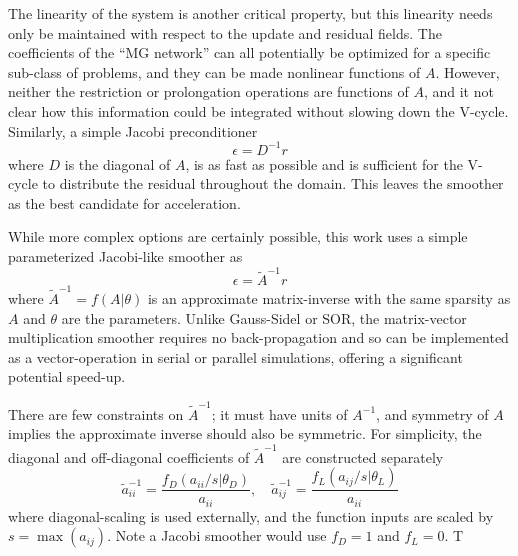 \documentclass[review]{elsarticle}
\begin{document}
The linearity of the system is another critical property, but this linearity needs only be maintained with respect to the update and residual fields. The coefficients of the ``MG network'' can all potentially be optimized for a specific sub-class of problems, and they can be made nonlinear functions of $A$. However, neither the restriction or prolongation operations are functions of $A$, and it not clear how this information could be integrated without slowing down the V-cycle. Similarly, a simple Jacobi preconditioner
\begin{equation}
    \epsilon = D^{-1}r
\end{equation}
where $D$ is the diagonal of $A$, is as fast as possible and is sufficient for the V-cycle to distribute the residual throughout the domain. This leaves the smoother as the best candidate for acceleration.

While more complex options are certainly possible, this work uses a simple parameterized Jacobi-like smoother as
\begin{equation}
    \epsilon = \tilde A^{-1}r
\end{equation}
where $\tilde A^{-1}=f(A|\theta)$ is an approximate matrix-inverse with the same sparsity as $A$ and $\theta$ are the parameters. Unlike Gauss-Sidel or SOR, the matrix-vector multiplication smoother requires no back-propagation and so can be implemented as a vector-operation in serial or parallel simulations, offering a significant potential speed-up.

There are few constraints on $\tilde A^{-1}$; it must have units of $A^{-1}$, and symmetry of $A$ implies the approximate inverse should also be symmetric. For simplicity, the diagonal and off-diagonal coefficients of $\tilde A^{-1}$ are constructed separately
\begin{equation}
    \tilde a^{-1}_{ii} = \frac{f_D(a_{ii}/s|\theta_D)}{a_{ii}} , \quad
    \tilde a^{-1}_{ij} = \frac{f_L(a_{ij}/s|\theta_L)}{a_{ii}}
\end{equation}
where diagonal-scaling is used externally, and the function inputs are scaled by $s=\max(a_{ij})$. Note a Jacobi smoother would use $f_D=1$ and $f_L=0$. T
\end{document}
